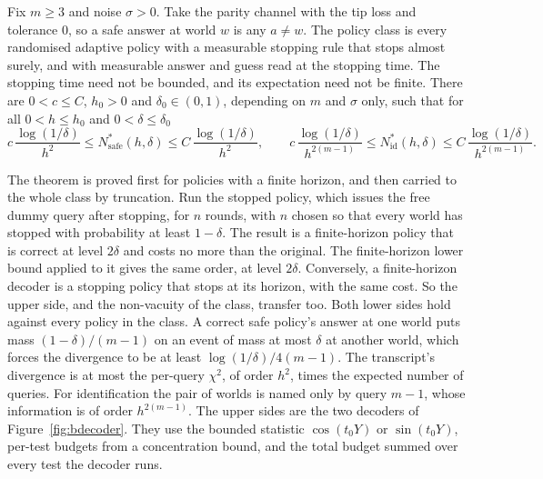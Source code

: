 \begin{theorem}
\label{thm:endpoint}
Fix $m\ge3$ and noise $\sigma>0$. Take the parity channel with the tip loss and tolerance
$0$, so a safe answer at world $w$ is any $a\ne w$. The policy class is every randomised
adaptive policy with a measurable stopping rule that stops almost surely, and with
measurable answer and guess read at the stopping time. The stopping time need not be
bounded, and its expectation need not be finite. There are
$0<c\le C$, $h_{0}>0$ and $\delta_{0}\in(0,1)$, depending on $m$ and $\sigma$ only, such that
for all $0<h\le h_{0}$ and $0<\delta\le\delta_{0}$
\[
c\,\frac{\log(1/\delta)}{h^{2}}\le N^{*}_{\mathrm{safe}}(h,\delta)\le C\,\frac{\log(1/\delta)}{h^{2}},
\qquad
c\,\frac{\log(1/\delta)}{h^{2(m-1)}}\le N^{*}_{\mathrm{id}}(h,\delta)\le C\,\frac{\log(1/\delta)}{h^{2(m-1)}} .
\]
\end{theorem}

The theorem is proved first for policies with a finite horizon, and then carried to the
whole class by truncation. Run the stopped policy, which issues the free dummy query after
stopping, for $n$ rounds, with $n$ chosen so that every world has stopped with probability at
least $1-\delta$. The result is a finite-horizon policy that is correct at level $2\delta$ and
costs no more than the original. The finite-horizon lower bound applied to it gives the same
order, at level $2\delta$. Conversely, a finite-horizon decoder is a stopping policy that
stops at its horizon, with the same cost. So the upper side, and the non-vacuity of the
class, transfer too. Both lower sides hold against every policy in the class. A correct safe policy's answer at
one world puts mass $(1-\delta)/(m-1)$ on an event of mass at most $\delta$ at another world,
which forces the divergence to be at least $\log(1/\delta)/4(m-1)$. The transcript's
divergence is at most the per-query $\chi^{2}$, of order $h^{2}$, times the expected number of
queries. For identification the pair of worlds is named only by query $m-1$, whose
information is of order $h^{2(m-1)}$. The upper sides are the two decoders of
Figure~\ref{fig:bdecoder}. They use the bounded statistic $\cos(t_{0}Y)$ or $\sin(t_{0}Y)$,
per-test budgets from a concentration bound, and the total budget summed over every test the
decoder runs.


